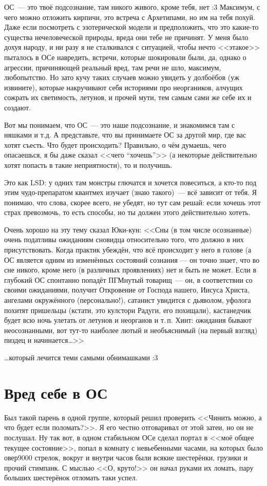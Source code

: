 \documentclass[a4paper,14pt,oneside]{memoir}
\begin{document}
\medskip
ОС~--- это твоё подсознание, там никого живого, кроме тебя, нет :3 Максимум, с чего можно отложить кирпичи, это встреча с Архетипами, но им на тебя похуй. Даже если посмотреть с эзотерической модели и предположить, что это какие-то существа нечеловеческой природы, вреда они тебе не причинят. У меня было дохуя народу, и ни разу я не сталкивался с ситуацией, чтобы нечто <<этакое>> пыталось в ОСе навредить, встречи, которые шокировали были, да, однако о агрессии, причиняющей реальный вред, там речи не шло, максимум, любопытство. Но зато кучу таких случаев можно увидеть у долбоёбов (уж извините), которые накручивают себя историями про неоргаников, алчущих сожрать их светимость, летунов, и прочей мути, тем самым сами же себе их и создают. 

Вот мы понимаем, что ОС~--- это наше подсознание, и знакомимся там с няшками и т.д. А представьте, что вы принимаете ОС за другой мир, где вас хотят съесть. Что будет происходить? Правильно, о чём думаешь, чего опасаешься, я бы даже сказал <<чего “хочешь”>> (а некоторые действительно хотят попасть в такие неприятности), то и получишь. 

Это как LSD: у одних там монстры глючатся и хочется повеситься, а кто-то под этим чудо-препаратом квантмех изучает (знаю такого)~--- всё зависит от тебя. Я понимаю, что слова, скорее всего, не убедят, но тут сам решай: если хочешь этот страх превозмочь, то есть способы, но ты должен этого действительно хотеть. 

Очень хорошо на эту тему сказал Юки-кун:
\smallskip 
<<Сны (в том числе осознанные) очень податливы ожиданиям сновидца относительно того, что должно в них присутствовать. Когда практик убеждён, что всё происходит у него в голове (а ОС является одним из изменённых состояний сознания — он точно знает, что во сне никого, кроме него (в различных проявлениях) нет и быть не может. Если в глубокий ОС спонтанно попадёт ПГМнутый товарищ~--- он, в соответствии со своими ожиданиями, получит Откровение от Господа нашего, Иисуса Христа, ангелами окружённого (персонально!), сатанист увидится с дьяволом, уфолога похитят пришельцы (кстати, это кулстори Радуги, его похищали), кастанедчик будет всю ночь улетать от летунов и неорганов и т.\,п. Хинт: ожидания бывают неосознанными, вот тут-то наиболее лютый и необъяснимый (на первый взгляд) пиздец и начинается\ldots>>

\ldots который лечится теми самыми обнимашками :3




\section{Вред себе в ОС}
Был такой парень в одной группе, который решил проверить <<Чинить можно, а что будет если поломать?>>. Я его честно отговаривал от этой затеи, но он не послушал. Ну так вот, в одном стабильном ОСе сделал портал в <<моё общее текущее состояние>>, попал в комнату с невьебенными часами, на которых было овер9000 стрелок, вокруг и внутри часов были всякие шестерёнки, грузики и прочий стимпанк. С мыслью <<О, круто!>> он начал руками их ломать, пару больших шестерёнок отломать таки успел.
 
\end{document}
